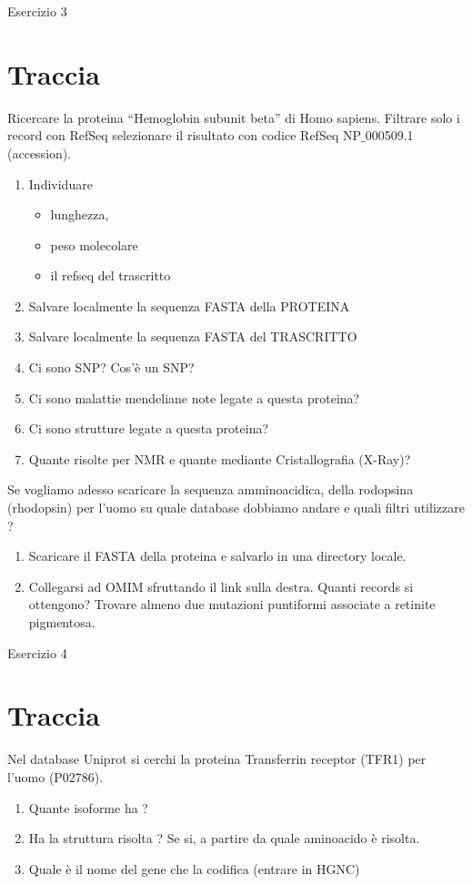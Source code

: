 \documentclass{article}
\begin{document}
\begin{center}
   \huge
   Esercizio 3
\end{center}
\section*{Traccia}
Ricercare la proteina “Hemoglobin subunit beta” di Homo sapiens. Filtrare solo i record con RefSeq selezionare il risultato con codice RefSeq NP$\_$000509.1 (accession).
\begin{enumerate}
   \item Individuare
   \begin{itemize}
      \item lunghezza,
      \item peso molecolare
      \item il refseq del trascritto
   \end{itemize}
   \item Salvare localmente la sequenza FASTA della PROTEINA
   \item Salvare localmente la sequenza FASTA del TRASCRITTO
   \item Ci sono SNP? Cos’è un SNP?
   \item Ci sono malattie mendeliane note legate a questa proteina?
   \item Ci sono strutture legate a questa proteina?
      \item Quante risolte per NMR e quante mediante Cristallografia (X-Ray)?
\end{enumerate}
Se vogliamo adesso scaricare la sequenza amminoacidica, della rodopsina (rhodopsin) per l’uomo su quale database dobbiamo andare e quali filtri utilizzare ?
\begin{enumerate}
   \item Scaricare il FASTA della proteina e salvarlo in una directory locale.
   \item Collegarsi ad OMIM sfruttando il link sulla destra. Quanti records si ottengono? Trovare almeno due mutazioni puntiformi associate a retinite pigmentosa.
\end{enumerate}

\begin{center}
   \huge
   Esercizio 4
\end{center}
\section*{Traccia}
Nel database Uniprot si cerchi la proteina Transferrin receptor (TFR1) per l’uomo (P02786).
\begin{enumerate}
   \item Quante isoforme ha ?
   \item Ha la struttura risolta ? Se si, a partire da quale aminoacido è risolta.
   \item Quale è il nome del gene che la codifica (entrare in HGNC)
\end{enumerate}
\end{document}
